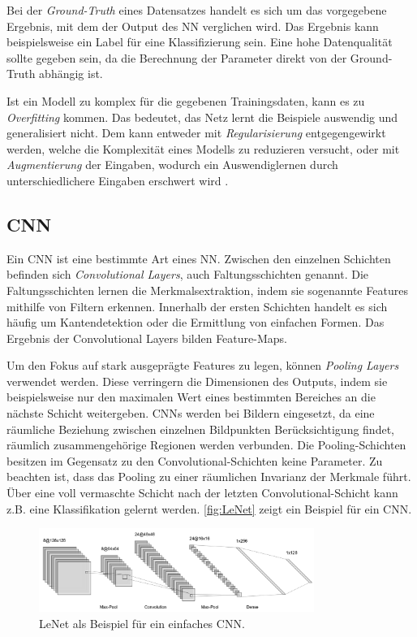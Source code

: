 Bei der \textit{Ground-Truth} eines Datensatzes handelt es sich um das vorgegebene Ergebnis, mit dem der Output des \ac{NN}	verglichen wird.
Das Ergebnis kann beispielsweise ein Label für eine Klassifizierung sein.
Eine hohe Datenqualität sollte gegeben sein, da die Berechnung der Parameter direkt von der Ground-Truth abhängig ist.

Ist ein Modell zu komplex für die gegebenen Trainingsdaten, kann es zu \textit{Overfitting} kommen. Das bedeutet, 
das Netz lernt die Beispiele auswendig und generalisiert nicht. 
Dem kann entweder mit \textit{Regularisierung} entgegengewirkt werden, welche die Komplexität eines Modells zu reduzieren versucht,
oder mit \textit{Augmentierung} der Eingaben, wodurch ein Auswendiglernen durch unterschiedlichere Eingaben erschwert wird  
\cites{Goodfellow.2016, Russell.2012}.


\subsection{\acf{CNN}}

Ein \ac{CNN} ist eine bestimmte Art eines \ac{NN}.
Zwischen den einzelnen Schichten befinden sich \textit{Convolutional Layers}, auch Faltungsschichten genannt.
Die Faltungsschichten lernen die Merkmalsextraktion, indem sie sogenannte Features mithilfe von Filtern erkennen.
Innerhalb der ersten Schichten handelt es sich häufig um Kantendetektion oder die Ermittlung von einfachen Formen.
Das Ergebnis der Convolutional Layers bilden Feature-Maps.

Um den Fokus auf stark ausgeprägte Features zu legen, können \textit{Pooling Layers} verwendet werden.
Diese verringern die Dimensionen des Outputs, indem sie beispielsweise nur den maximalen Wert eines bestimmten Bereiches an die nächste Schicht weitergeben.
\ac{CNN}s werden bei Bildern eingesetzt, da eine räumliche Beziehung zwischen einzelnen Bildpunkten Berücksichtigung findet, räumlich zusammengehörige Regionen werden verbunden.
Die Pooling-Schichten besitzen im Gegensatz zu den Convolutional-Schichten keine Parameter.
Zu beachten ist, dass das Pooling zu einer räumlichen Invarianz der Merkmale führt.
Über eine voll vermaschte Schicht nach der letzten Convolutional-Schicht kann z.B. eine Klassifikation gelernt werden.
\autoref{fig:LeNet} zeigt ein Beispiel für ein \ac{CNN}.

\begin{figure}
	\centering
	\includegraphics[width=0.8\textwidth]{Bilder/LeNet.png} 
	\caption{LeNet als Beispiel für ein einfaches \ac{CNN}.}
	\label{fig:LeNet}
\end{figure}

